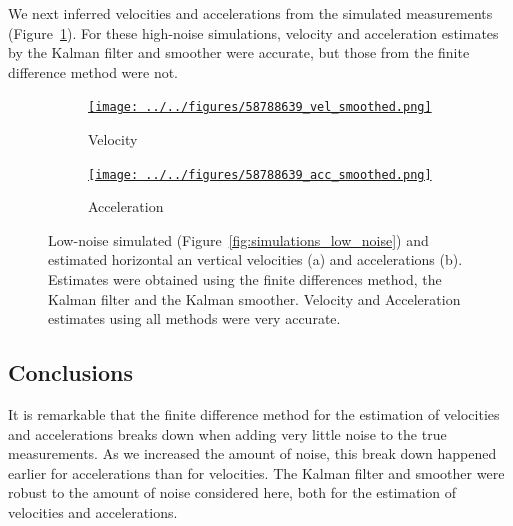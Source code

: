 \documentclass[12pt]{article}
\begin{document}
We next inferred velocities and accelerations from the simulated measurements
(Figure~\ref{fig:vel_acc_high_noise}).  For these high-noise simulations,
velocity and acceleration estimates by the Kalman filter and smoother were
accurate, but those from the finite difference method were not.

\begin{figure}

    \begin{subfigure}{\textwidth}
        \centering
        \href{http://www.gatsby.ucl.ac.uk/~rapela/fwg/lds_repo/inference/figures/58788639_vel_smoothed.html}{\texttt{[image: ../../figures/58788639\_vel\_smoothed.png]}}
        \caption{Velocity}
    \end{subfigure}

    \begin{subfigure}{\textwidth}
        \centering
        \href{http://www.gatsby.ucl.ac.uk/~rapela/fwg/lds_repo/inference/figures/58788639_acc_smoothed.html}{\texttt{[image: ../../figures/58788639\_acc\_smoothed.png]}}
        \caption{Acceleration}
    \end{subfigure}

    \caption{Low-noise simulated (Figure~\ref{fig:simulations_low_noise}) and
    estimated horizontal an vertical velocities (a) and accelerations (b).
    Estimates were obtained using the finite differences method, the Kalman
    filter and the Kalman smoother. Velocity and Acceleration estimates using
    all methods were very accurate.}

    \label{fig:vel_acc_high_noise}

\end{figure}

\subsection{Conclusions}

It is remarkable that the finite difference method for the estimation of
velocities and accelerations breaks down when adding very little noise to the
true measurements. As we increased the amount of noise, this break down
happened earlier for accelerations than for velocities.
%
The Kalman filter and smoother were robust to the amount of noise considered
here, both for the estimation of velocities and accelerations.



\end{document}
